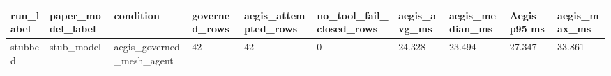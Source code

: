 \begin{tabular}{llllllllll}
 \hline
run\_label & paper\_model\_label & condition & governed\_rows & aegis\_attempted\_rows & no\_tool\_fail\_closed\_rows & aegis\_avg\_ms & aegis\_median\_ms & Aegis p95 ms & aegis\_max\_ms \\
 \hline
stubbed & stub\_model & aegis\_governed\_mesh\_agent & 42 & 42 & 0 & 24.328 & 23.494 & 27.347 & 33.861 \\
 \hline
\end{tabular}
